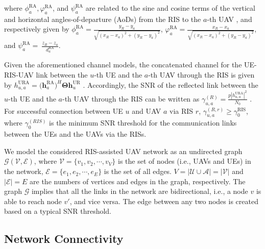 \documentclass[conference]{IEEEtran}
\begin{document}
where $\phi_{a}^\text{RA}, \varphi_{a}^\text{RA}$, and $\psi_{a}^\text{RA}$ are related to the sine and cosine terms of the vertical and horizontal angles-of-departure (AoDs)
from the RIS to the $a$-th UAV \cite{9293155}, and respectively given by $\phi_{a}^\text{RA}=\frac{y_{R}-y_{a}}{\sqrt{(x_R-x_a)^2+(y_R-y_a)^2}}$, $\varphi_{a}^\text{RA}=\frac{x_{R}-x_{a}}{\sqrt{(x_R-x_a)^2+(y_R-y_a)^2}}$, and $\psi_{a}^\text{RA}=~\frac{z_R-z_a}{d^\text{RA}_{a}}$.


Given the aforementioned channel models, the concatenated channel for the
UE-RIS-UAV link between the $u$-th UE and the $a$-th UAV through the RIS is given by 
$h^\text{URA}_{u,a} =  (\mathbf h^\text{RA}_{a} \mathbf)^H \mathbf{\Theta} \mathbf h^\text{UR}_{u}$ \cite{9293155}. Accordingly, the SNR of the reflected link between the $u$-th UE and the $a$-th UAV through the RIS can be written as 
$\gamma^{(R)}_{u,a}= \frac{p |h^\text{URA}_{u,a}|^2}{N_0}$ \cite{9593204}.
For successful connection between UE $u$ and UAV $a$ via RIS $r$, $\gamma^{(R,r)}_{u,a} \geq \gamma^\text{RIS}_{0}$, where $\gamma^{(RIS)}_{0}$ is the minimum SNR threshold for the communication links between the UEs and the UAVs via the RISs. 


We model the considered RIS-assisted UAV network as an undirected
 graph $\mathcal G(\mathcal V, \mathcal E)$, where $\mathcal V = \{v_1, v_2, \cdots, v_V\}$ is the
set of nodes (i.e., UAVs and UEs) in the network, $\mathcal E= \{e_1, e_2, \cdots, e_E\}$ is the set of all edges.
$V=|\mathcal U \cup \mathcal A| =|\mathcal V|$ and $|\mathcal E|=E$ are the numbers of vertices and edges in the graph, respectively. The graph $\mathcal G$ implies that all the links in the network are bidirectional, i.e., a node $v$ is able to reach node $v'$, and vice versa. The edge between any two nodes is created based on a typical SNR threshold.



\subsection{Network Connectivity}
\end{document}
